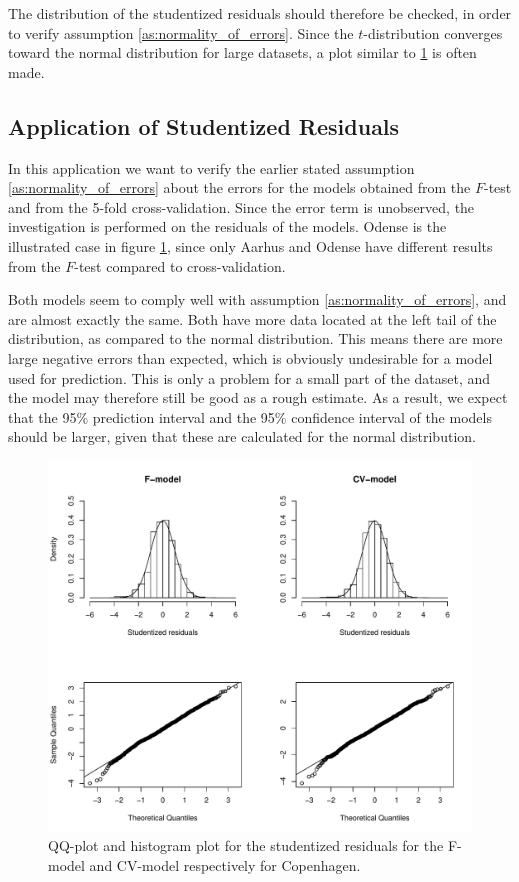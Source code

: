 The distribution of the studentized residuals should therefore be checked, in order to verify assumption \ref{as:normality_of_errors}. 
Since the $t$-distribution converges toward the normal distribution for large datasets, a plot similar to \ref{fig:studentized_res_plot} is often made.

\subsection{Application of Studentized Residuals} \label{sub:residuals}

In this application we want to verify the earlier stated assumption \ref{as:normality_of_errors} about the errors for the models obtained from the $F$-test and from the 5-fold cross-validation. 
Since the error term is unobserved, the investigation is performed on the residuals of the models.
Odense is the illustrated case in figure \ref{fig:studentized_res_plot}, since only Aarhus and Odense have different results from the $F$-test compared to cross-validation.

Both models seem to comply well with assumption \ref{as:normality_of_errors}, and are almost exactly the same.
Both have more data located at the left tail of the distribution, as compared to the normal distribution. 
This means there are more large negative errors than expected, which is obviously undesirable for a model used for prediction. 
This is only a problem for a small part of the dataset, and the model may therefore still be good as a rough estimate. 
As a result, we expect that the 95\% prediction interval and the 95\% confidence interval of the models should be larger, given that these are calculated for the normal distribution.

\begin{figure}[H]
    \centering
  \includegraphics[width = 0.9 \textwidth]{figures/Nanna/studentized_res_plot.pdf}
  \caption{QQ-plot and histogram plot for the studentized residuals for the F-model and CV-model respectively for Copenhagen.}
  \label{fig:studentized_res_plot}
\end{figure}

